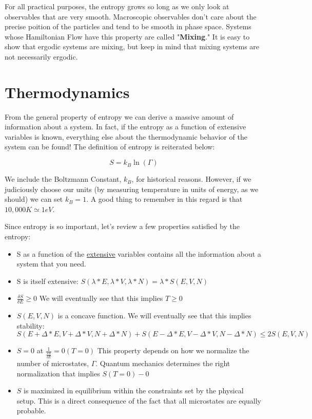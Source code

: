 \documentclass{article}
\newcommand{\pardif}[2]{\frac{\delta#1}{\delta#2}}
\newcommand{\bltz}{k_{B}}
\begin{document}
For all practical purposes, the entropy grows so long as we only look at observables that are very smooth.  Macroscopic observables don't care about the precise poition of the particles and tend to be smooth in phase space.  Systems whose Hamiltonian Flow have this property are called "\textbf{Mixing}."  It is easy to show that ergodic systems are mixing, but keep in mind that mixing systems are not necessarily ergodic.    

\part{Thermodynamics}

From the general property of entropy we can derive a massive amount of information about a system.  In fact, if the entropy as a function of extensive variables is known, everything else about the thermodynamic behavior of the system can be found!  The definition of entropy is reiterated below:

$$S=\bltz\ln(\Gamma)$$

We include the Boltzmann Constant, $\bltz$, for historical reasons.  However, if we judiciously choose our units (by measuring temperature in units of energy, as we should) we can set $\bltz=1$.  A good thing to remember in this regard is that $10,000K\simeq1eV$.  

Since entropy is so important, let's review a few properties satisfied by the entropy:

\begin{itemize}
	\item S as a function of the \underline{extensive} variables contains all the information about a system that you need.
	\item S is itself extensive: $S(\lambda*E,\lambda*V,\lambda*N)=\lambda*S(E,V,N)$
	\item $\pardif{S}{E}\geq0$  We will eventually see that this implies $T\geq0$
	\item $S(E,V,N)$ is a concave function.  We will eventually see that this implies stability: \\
	$S(E+\Delta*E,V+\Delta*V,N+\Delta*N)+S(E-\Delta*E,V-\Delta*V,N-\Delta*N)\leq2S(E,V,N)$\\ 
	\item $S=0$ at $\frac{1}{\pardif{S}{E}}=0 (T=0)$  This property depends on how we normalize the number of microstates, $\Gamma$.  Quantum mechanics determines the right normalization that implies $S(T=0)-0$
	\item $S$ is maximized in equilibrium within the constraints set by the physical setup.  This is a direct consequence of the fact that all microstates are equally probable.
\end{itemize}
\end{document}
